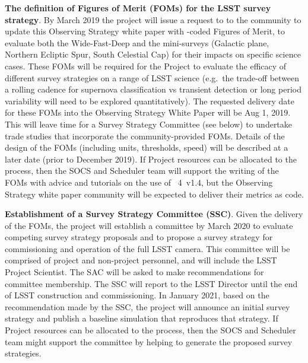 \begin{description}
\item \textbf{The definition of Figures of Merit (FOMs) for the LSST
survey strategy}. By March 2019 the project will issue a request to
to the community to update this Observing Strategy white paper with
\MAF-coded Figures of Merit, to evaluate both the Wide-Fast-Deep and the
mini-surveys (Galactic plane, Northern Ecliptic Spur, South Celestial
Cap) for their impacts on specific science cases. These FOMs will be
required for the Project to evaluate the efficacy of different survey
strategies on a range of LSST science (e.g.\ the trade-off between a
rolling cadence for supernova classification vs transient detection or
long period variability will need to be explored quantitatively). The
requested delivery date for these \MAF FOMs into the Observing Strategy
White Paper will be Aug 1, 2019.  This will leave time for a Survey
Strategy Committee (see below) to undertake trade studies that
incorporate the community-provided FOMs. Details of the design of the
FOMs (including units, thresholds, speed) will be described at a later
date (prior to December 2019). If Project resources can be allocated to
the process, then the SOCS and Scheduler team will support the writing
of the FOMs with advice and tutorials on the use of \OpSim~4~v1.4, but
the Observing Strategy white paper community will be expected to deliver
their metrics as \MAF code.

\item \textbf{Establishment of a Survey Strategy Committee (SSC)}. Given
the delivery of the FOMs, the project will establish a committee by March
2020 to evaluate competing survey strategy proposals and to propose a
survey strategy for commissioning and operation of the full LSST camera.
This committee will be comprised of project and non-project personnel, and
will include the LSST Project Scientist. The SAC will be asked to
make recommendations for committee membership. The SSC will report to
the LSST Director until the end of LSST construction and commissioning.
In January 2021, based on the recommendation made by the SSC, the
project will announce an initial survey strategy and publish a baseline
simulation that reproduces that strategy. If Project resources can be
allocated to the process, then the SOCS and Scheduler team might support
the committee by helping to generate the proposed survey strategies.

\end{description}

